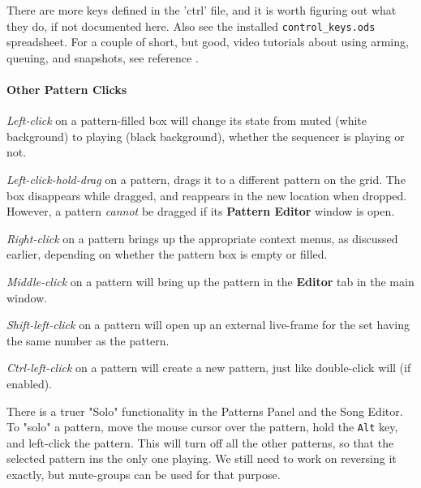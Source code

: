    There are more keys defined in the 'ctrl' file, and it is
   worth figuring out what they do, if not documented here.
   Also see the installed \texttt{control\_keys.ods} spreadsheet.
   For a couple of short, but good, video tutorials about using arming,
   queuing, and snapshots, see reference \cite{wootangent1}.

\paragraph{Other Pattern Clicks}
\label{paragraph:patterns_pattern_clicks}

   \textsl{Left-click} on a pattern-filled box will change its state
   from muted (white background) to playing (black background), whether
   the sequencer is playing or not.

   \textsl{Left-click-hold-drag} on a pattern, drags it to a different
   pattern on the grid.
   The box disappears while dragged, and reappears in the new location when
   dropped.  However, a pattern \textsl{cannot} be dragged if its
   \textbf{Pattern Editor} window is open.

   \textsl{Right-click} on a pattern brings up the appropriate context menus, as
   discussed earlier, depending on whether the pattern box is empty or
   filled.

   \textsl{Middle-click} on a pattern will bring up the pattern
   in the \textbf{Editor}
   tab in the main window.

   \textsl{Shift-left-click} on a pattern will open up an external
   live-frame for the
   set having the same number as the pattern.

   \textsl{Ctrl-left-click} on a pattern will create a new pattern, just like
   double-click will (if enabled).

   There is a truer "Solo" functionality in the Patterns
   Panel and the Song Editor.  To "solo" a pattern, move the mouse cursor
   over the pattern, hold the \texttt{Alt} key, and left-click the pattern.
   This will turn off all the other patterns, so that the selected pattern ins
   the only one playing.
   We still need to work on reversing it exactly, but
   mute-groups can be used for that purpose.

